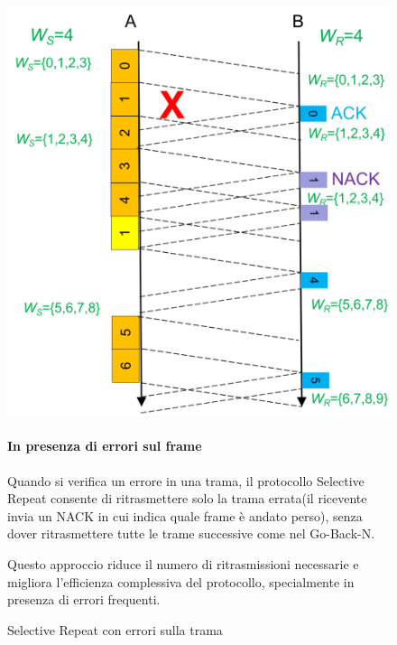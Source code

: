 \begin{figure}[htbp]
    \centering
    \begin{minipage}{0.47\textwidth}
        \includegraphics[width=\linewidth]{images/srerroritrama.png}
        \caption{Selective Repeat con errori sulla trama}
    \end{minipage}%
    \hfill
    \begin{minipage}{0.49\textwidth}
        \paragraph{In presenza di errori sul frame}

        Quando si verifica un errore in una trama, il protocollo Selective Repeat consente di ritrasmettere solo la trama errata(il ricevente invia un NACK in cui indica quale frame è andato perso), senza dover ritrasmettere tutte le trame successive come nel Go-Back-N. 

        Questo approccio riduce il numero di ritrasmissioni necessarie e migliora l'efficienza complessiva del protocollo, specialmente in presenza di errori frequenti.
    \end{minipage}
\end{figure}


